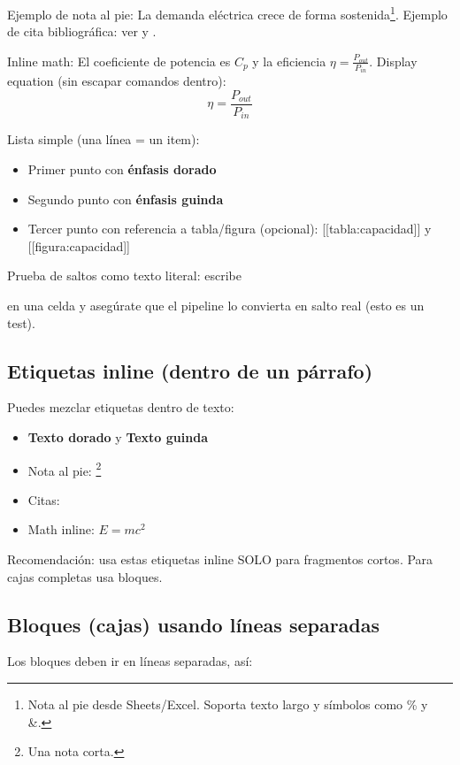 \documentclass{sener2025}
\begin{document}
Ejemplo de nota al pie: La demanda eléctrica crece de forma sostenida\footnote{Nota al pie desde Sheets/Excel. Soporta texto largo y símbolos como \% y \&.}.
Ejemplo de cita bibliográfica: ver \cite{demo_sener2025} y \cite{cenace2023_flex}.

Inline math: El coeficiente de potencia es $C_p$ y la eficiencia $\eta = \frac{P_{out}}{P_{in}}$.
Display equation (sin escapar comandos dentro):
\begin{equation}
\eta = \frac{P_{out}}{P_{in}}
\end{equation}

Lista simple (una línea = un item):
\begin{itemize}
  \item Primer punto con \textbf{\textcolor{gobmxDorado}{énfasis dorado}}
  \item Segundo punto con \textbf{\textcolor{gobmxGuinda}{énfasis guinda}}
  \item Tercer punto con referencia a tabla/figura (opcional): [[tabla:capacidad]] y [[figura:capacidad]]
\end{itemize}
Prueba de saltos como texto literal: escribe

 en una celda y asegúrate que el pipeline lo convierta en salto real (esto es un test).


\subsection{Etiquetas inline (dentro de un párrafo)}

Puedes mezclar etiquetas dentro de texto:
\begin{itemize}
  \item \textbf{\textcolor{gobmxDorado}{Texto dorado}} y \textbf{\textcolor{gobmxGuinda}{Texto guinda}}
  \item Nota al pie: \footnote{Una nota corta.}
  \item Citas: \cite{demo_sener2025}
  \item Math inline: $E = mc^2$
\end{itemize}
Recomendación: usa estas etiquetas inline SOLO para fragmentos cortos. Para cajas completas usa bloques.


\subsection{Bloques (cajas) usando líneas separadas}

Los bloques deben ir en líneas separadas, así:
\end{document}
